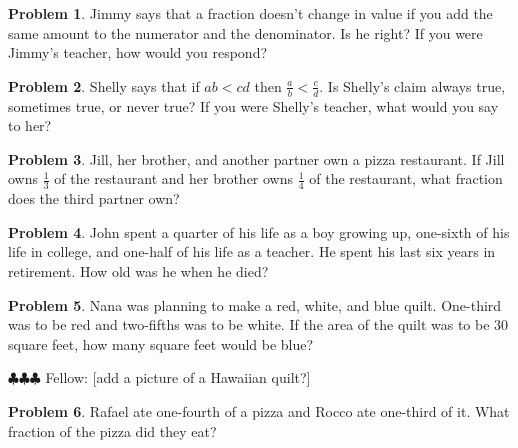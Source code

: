 \documentclass[10pt, reqno]{amsart}
\theoremstyle{remark}
\theoremstyle{definition}
\newtheorem{problem}{Problem}
\numberwithin{equation}{section}  %
\newcommand{\fellow}[1]{{\color{magenta} \sf $\clubsuit\clubsuit\clubsuit$ Fellow: [#1]}}
\begin{document}
\begin{problem}
Jimmy says that a fraction doesn't change in value if you add the same amount to the numerator and the denominator.  Is he right?  If you were Jimmy's teacher, how would you respond?

\end{problem}


\begin{problem}
Shelly says that if $ab < cd$ then $\frac a b< \frac c d$.  Is Shelly's claim always true, sometimes true, or never true?  If you were Shelly's teacher, what would you say to her?

\end{problem}



 \begin{problem}
Jill, her brother, and another partner own a pizza restaurant.  If Jill owns $\frac 1 3$ of the restaurant and her brother owns $\frac 1 4$ of the restaurant, what fraction does the third partner own?
\end{problem}
 


\begin{problem}
John spent a quarter of his life as a boy growing up, one-sixth of his life in college, and one-half of his life as a teacher.  He spent his last six years in retirement.  How old was he when he died?
\end{problem}

\begin{problem}
Nana was planning to make a red, white, and blue quilt.
One-third was to be red and two-fifths was to be white. If
the area of the quilt was to be 30 square feet, how many
square feet would be blue?
\end{problem}
\fellow{add a picture of a Hawaiian quilt?}

\begin{problem}
 Rafael ate one-fourth of a pizza and Rocco ate one-third of it.  What fraction of the pizza did they eat?
\end{problem}
\end{document}
